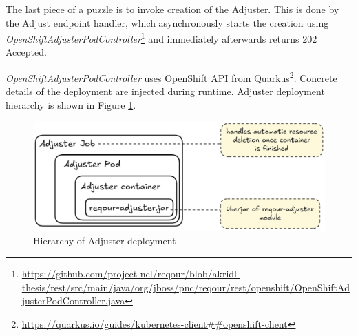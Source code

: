 \documentclass[../main.tex]{subfiles}
\begin{document}
The last piece of a puzzle is to invoke creation of the Adjuster. This is done by the Adjust endpoint handler, which asynchronously starts the creation using \textit{OpenShiftAdjusterPodController}\footnote{\url{https://github.com/project-ncl/reqour/blob/akridl-thesis/rest/src/main/java/org/jboss/pnc/reqour/rest/openshift/OpenShiftAdjusterPodController.java}}  and immediately afterwards returns 202 Accepted.

\textit{OpenShiftAdjusterPodController} uses OpenShift API from Quarkus\footnote{\url{https://quarkus.io/guides/kubernetes-client##openshift-client}}. Concrete details of the deployment are injected during runtime. Adjuster deployment hierarchy is shown in Figure \ref{fig:adjuster-deployment}.

\begin{figure}
  \begin{center}
    \includegraphics[width=\textwidth]{images/adjuster-deployment.png}
  \end{center}
  \caption{Hierarchy of Adjuster deployment}
  \label{fig:adjuster-deployment}
\end{figure}
\end{document}

